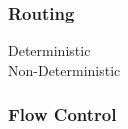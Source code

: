 \subsubsection{Routing}
\begin{description}
\item[Deterministic]
\item[Non-Deterministic]
\end{description}
\subsubsection{Flow Control}

